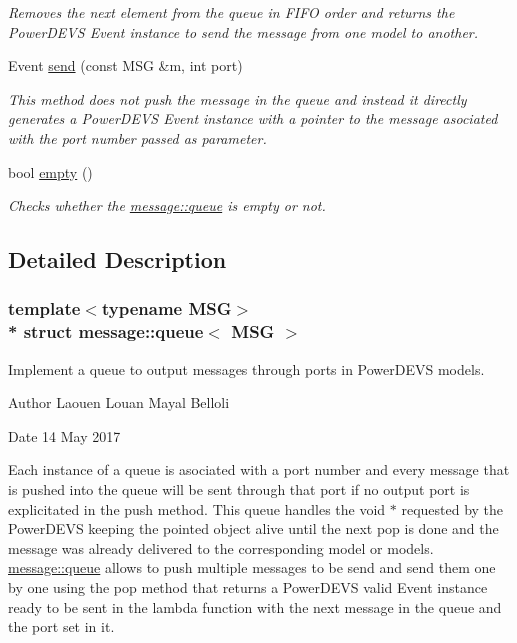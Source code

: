 \begin{DoxyCompactItemize}
\begin{DoxyCompactList}\small\item\em Removes the next element from the queue in F\+I\+FO order and returns the Power\+D\+E\+VS Event instance to send the message from one model to another. \end{DoxyCompactList}\item 
Event \hyperlink{classmessage_1_1queue_a05cd5f07a0ba524f1a41340b821724c5}{send} (const M\+SG \&m, int port)
\begin{DoxyCompactList}\small\item\em This method does not push the message in the queue and instead it directly generates a Power\+D\+E\+VS Event instance with a pointer to the message asociated with the port number passed as parameter. \end{DoxyCompactList}\item 
bool \hyperlink{classmessage_1_1queue_ab03011f8c323c553b3f8b6d5c84ae9db}{empty} ()
\begin{DoxyCompactList}\small\item\em Checks whether the \hyperlink{classmessage_1_1queue}{message\+::queue} is empty or not. \end{DoxyCompactList}\end{DoxyCompactItemize}


\subsection{Detailed Description}
\subsubsection*{template$<$typename M\+SG$>$\\*
struct message\+::queue$<$ M\+S\+G $>$}

Implement a queue to output messages through ports in Power\+D\+E\+VS models. 

\begin{DoxyAuthor}{Author}
Laouen Louan Mayal Belloli 
\end{DoxyAuthor}
\begin{DoxyDate}{Date}
14 May 2017
\end{DoxyDate}
Each instance of a queue is asociated with a port number and every message that is pushed into the queue will be sent through that port if no output port is explicitated in the push method. This queue handles the void $\ast$ requested by the Power\+D\+E\+VS keeping the pointed object alive until the next pop is done and the message was already delivered to the corresponding model or models. \hyperlink{classmessage_1_1queue}{message\+::queue} allows to push multiple messages to be send and send them one by one using the pop method that returns a Power\+D\+E\+VS valid Event instance ready to be sent in the lambda function with the next message in the queue and the port set in it.



